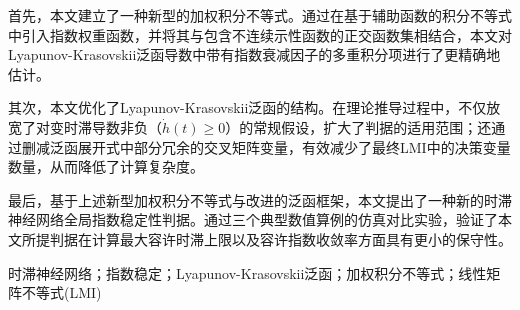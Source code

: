 \documentclass[a4paper, 12pt, oneside]{article}
\theoremstyle{cn_theorem}
\begin{document}
首先，本文建立了一种新型的加权积分不等式。通过在基于辅助函数的积分不等式中引入指数权重函数，并将其与包含不连续示性函数的正交函数集相结合，本文对Lyapunov-Krasovskii泛函导数中带有指数衰减因子的多重积分项进行了更精确地估计。

其次，本文优化了Lyapunov-Krasovskii泛函的结构。在理论推导过程中，不仅放宽了对变时滞导数非负（$\dot{h}(t) \ge 0$）的常规假设，扩大了判据的适用范围；还通过删减泛函展开式中部分冗余的交叉矩阵变量，有效减少了最终LMI中的决策变量数量，从而降低了计算复杂度。

最后，基于上述新型加权积分不等式与改进的泛函框架，本文提出了一种新的时滞神经网络全局指数稳定性判据。通过三个典型数值算例的仿真对比实验，验证了本文所提判据在计算最大容许时滞上限以及容许指数收敛率方面具有更小的保守性。

时滞神经网络；指数稳定；Lyapunov-Krasovskii泛函；加权积分不等式；线性矩阵不等式(LMI)
    
\end{document}
